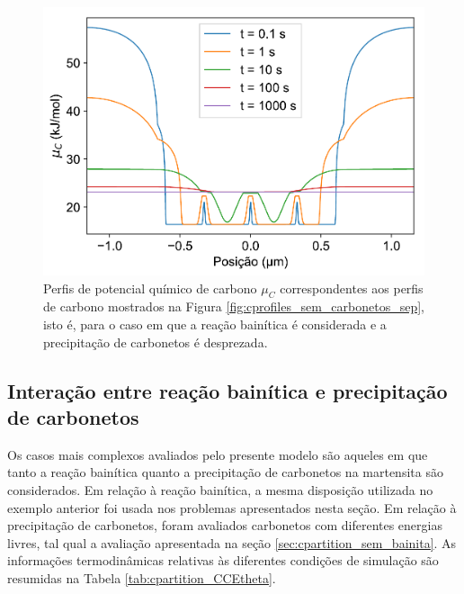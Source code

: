 \begin{figure}
  \includegraphics[width=.8\textwidth]{img/cpartition/muprofiles/coupled_FoFo_375_CCE.pdf}
  \caption{Perfis de potencial químico de carbono $\mu_C$ correspondentes aos perfis de carbono mostrados na Figura \ref{fig:cprofiles_sem_carbonetos_sep}, isto é, para o caso em que a reação bainítica é considerada e a precipitação de carbonetos é desprezada.}
  \label{fig:muprofiles_sem_carbonetos}
\end{figure}

\subsection{Interação entre reação bainítica e precipitação de carbonetos}

Os casos mais complexos avaliados pelo presente modelo são aqueles em que tanto a reação bainítica quanto a precipitação de carbonetos na martensita são considerados. Em relação à reação bainítica, a mesma disposição utilizada no exemplo anterior foi usada nos problemas apresentados nesta seção. Em relação à precipitação de carbonetos, foram avaliados carbonetos com diferentes energias livres, tal qual a avaliação apresentada na seção \ref{sec:cpartition_sem_bainita}. As informações termodinâmicas relativas às diferentes condições de simulação são resumidas na Tabela \ref{tab:cpartition_CCEtheta}.

